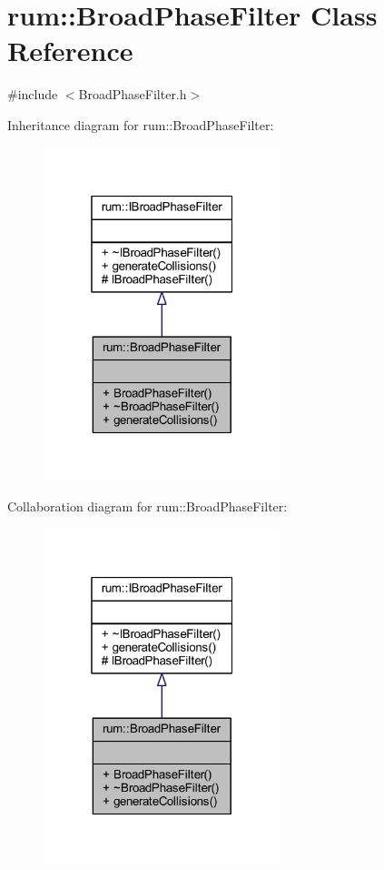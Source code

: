 \hypertarget{classrum_1_1_broad_phase_filter}{}\section{rum\+:\+:Broad\+Phase\+Filter Class Reference}
\label{classrum_1_1_broad_phase_filter}


{\ttfamily \#include $<$Broad\+Phase\+Filter.\+h$>$}



Inheritance diagram for rum\+:\+:Broad\+Phase\+Filter\+:\nopagebreak
\begin{figure}[H]
\begin{center}
\leavevmode
\includegraphics[width=196pt]{classrum_1_1_broad_phase_filter__inherit__graph}
\end{center}
\end{figure}


Collaboration diagram for rum\+:\+:Broad\+Phase\+Filter\+:\nopagebreak
\begin{figure}[H]
\begin{center}
\leavevmode
\includegraphics[width=196pt]{classrum_1_1_broad_phase_filter__coll__graph}
\end{center}
\end{figure}
